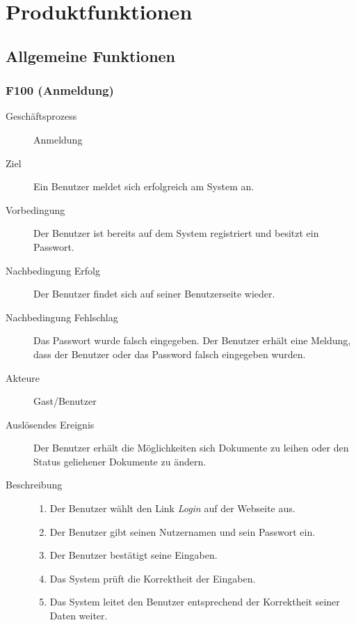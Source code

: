 
\chapter{Produktfunktionen}

\section{Allgemeine Funktionen}
\subsection{F100 (Anmeldung)}
\label{F:Anmeldung}
\begin{description}
  \item[Geschäftsprozess]Anmeldung
  \item[Ziel]Ein Benutzer meldet sich erfolgreich am System an.
  \item[Vorbedingung]Der Benutzer ist bereits auf dem System registriert und besitzt ein Passwort.
  \item[Nachbedingung Erfolg]Der Benutzer findet sich auf seiner Benutzerseite wieder.
  \item[Nachbedingung Fehlschlag]Das Passwort wurde falsch eingegeben. Der Benutzer erhält eine Meldung, dass der Benutzer oder das Password falsch eingegeben wurden.
  \item[Akteure]Gast/Benutzer
  \item[Auslösendes Ereignis]Der Benutzer erhält die Möglichkeiten sich Dokumente zu leihen oder den Status geliehener Dokumente zu ändern.
  \item[Beschreibung]\hfill
    \begin{enumerate}
      \item Der Benutzer wählt den Link \emph{Login} auf der Webseite aus.
      \item Der Benutzer gibt seinen Nutzernamen und sein Passwort ein.
      \item Der Benutzer bestätigt seine Eingaben.
      \item Das System prüft die Korrektheit der Eingaben.
      \item Das System leitet den Benutzer entsprechend der Korrektheit seiner Daten weiter.
    \end{enumerate}
\end{description}

